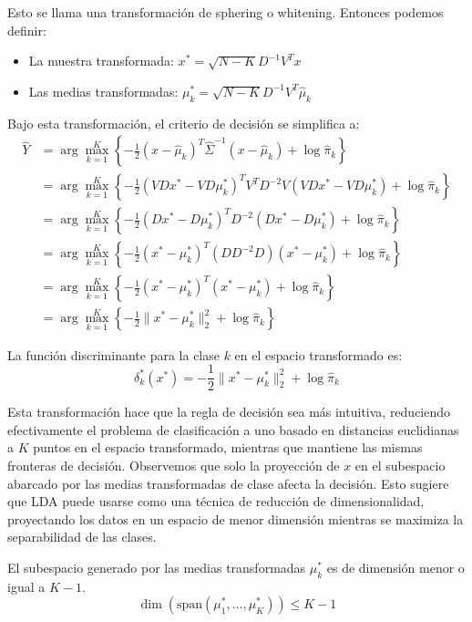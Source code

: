 Esto se llama una transformación de sphering o whitening. Entonces podemos definir:
\begin{itemize}
    \item La muestra transformada: $x^* = \sqrt{N-K}D^{-1}V^Tx$
    \item Las medias transformadas: $\mu_k^* = \sqrt{N-K}D^{-1}V^T\hat{\mu}_k$
\end{itemize}

Bajo esta transformación, el criterio de decisión se simplifica a:
\begin{align*}
\hat{Y} &= \arg\max_{k=1}^K \left\{-\frac{1}{2}(x - \hat{\mu}_k)^T \hat{\Sigma}^{-1} (x - \hat{\mu}_k) + \log \hat{\pi}_k\right\} \\
&= \arg\max_{k=1}^K \left\{-\frac{1}{2}(V D x^* - V D \mu_k^*)^T V^T D^{-2} V (V D x^* - V D \mu_k^*) + \log \hat{\pi}_k\right\} \\
&= \arg\max_{k=1}^K \left\{-\frac{1}{2}(D x^* - D \mu_k^*)^T D^{-2} (D x^* - D \mu_k^*) + \log \hat{\pi}_k\right\} \\
&= \arg\max_{k=1}^K \left\{-\frac{1}{2}(x^* - \mu_k^*)^T (D D^{-2} D) (x^* - \mu_k^*) + \log \hat{\pi}_k\right\} \\
&= \arg\max_{k=1}^K \left\{-\frac{1}{2}(x^* - \mu_k^*)^T (x^* - \mu_k^*) + \log \hat{\pi}_k\right\} \\
&= \arg\max_{k=1}^K \left\{-\frac{1}{2}\|x^* - \mu_k^*\|_2^2 + \log \hat{\pi}_k\right\}
\end{align*}

\begin{definition}
La función discriminante para la clase $k$ en el espacio transformado es:
\[
\delta_k^*(x^*) = -\frac{1}{2}\|x^* - \mu_k^*\|_2^2 + \log \hat{\pi}_k
\]
\end{definition}

Esta transformación hace que la regla de decisión sea más intuitiva, reduciendo efectivamente el problema de clasificación a uno basado en distancias euclidianas a $K$ puntos en el espacio transformado, mientras que mantiene las mismas fronteras de decisión. Observemos que solo la proyección de $x$ en el subespacio abarcado por las medias transformadas de clase afecta la decisión. Esto sugiere que LDA puede usarse como una técnica de reducción de dimensionalidad, proyectando los datos en un espacio de menor dimensión mientras se maximiza la separabilidad de las clases.

\begin{theorem}
El subespacio generado por las medias transformadas $\mu_k^*$ es de dimensión menor o igual a $K-1$.
\[
\dim(\mathrm{span}(\mu_1^*, \ldots, \mu_K^*)) \leq K-1
\]
\end{theorem}


